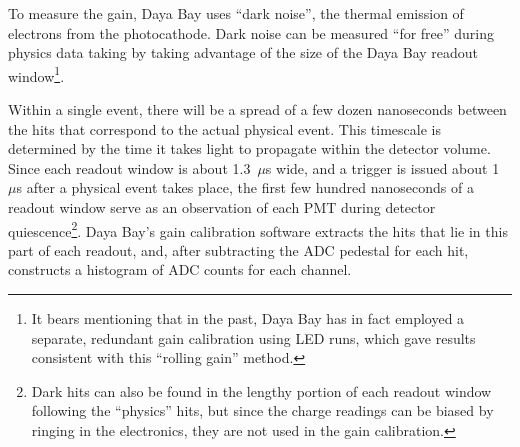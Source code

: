\documentclass[../thesis.tex]{subfiles}
\begin{document}
To measure the gain, Daya Bay uses ``dark noise'', the thermal emission of
electrons from the photocathode. Dark noise can be measured ``for free'' during
physics data taking by taking advantage of the size of the Daya Bay readout
window\footnote{It bears mentioning that in the past, Daya Bay has in fact
  employed a separate, redundant gain calibration using LED runs, which gave
  results consistent with this ``rolling gain'' method.}.
\begin{comment}
  \footnote{(WRONG) Each dynode can of course also emit electrons, but the
    collected charge is attenuated by $\mathcal{O}(5^n)$ for emission from the
    $n$th dynode. This effect can therefore be safely neglected for our
    purposes. NOTE: This can't be the reason. A 1/5-scale effect is certainly
    relevant if dynode thermal emission happens often enough. I believe the
    actual reason for only considering photocathode emission is that it's the
    only material that emits electrons at a significant rate (thanks to its work
    function?).}
\end{comment}
Within a single event, there will be a spread of a few dozen nanoseconds between
the hits that correspond to the actual physical event. This timescale is
determined by the time it takes light to propagate within the detector
volume. Since each readout window is about 1.3~$\mu$s wide, and a trigger is
issued about 1~$\mu$s after a physical event takes place, the first few hundred
nanoseconds of a readout window serve as an observation of each PMT during
detector quiescence\footnote{Dark hits can also be found in the lengthy portion
  of each readout window following the ``physics'' hits, but since the charge
  readings can be biased by ringing in the electronics, they are not used in the
  gain calibration.}. Daya Bay's gain calibration software extracts the hits
that lie in this part of each readout, and, after subtracting the ADC pedestal
for each hit, constructs a histogram of ADC counts for each channel.
\end{document}
